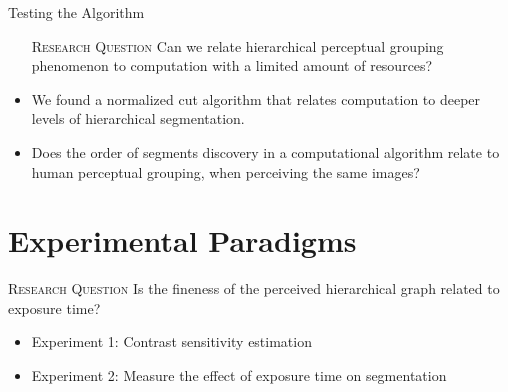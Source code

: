 \documentclass[10pt,xcolor=svgnames]{beamer} %
\begin{document}
\begin{frame}{Testing the Algorithm}
    \begin{itemize}
        \begin{exampleblock}{\textsc{Research Question}}
            Can we relate hierarchical perceptual grouping phenomenon to computation with a limited amount of resources?
        \end{exampleblock}
        \pause
        \item We found a normalized cut algorithm that relates computation to deeper levels of hierarchical segmentation.
        \pause
        \item Does the order of segments discovery in a computational algorithm relate to human perceptual grouping, when perceiving the same images?
    \end{itemize}
\end{frame}



\section{Experimental Paradigms}
\begin{frame}{}
    \begin{exampleblock}{\textsc{Research Question}}
        Is the fineness of the perceived hierarchical graph related to exposure time?
    \end{exampleblock}
    \pause
    \begin{itemize}
        \item Experiment 1: Contrast sensitivity estimation
        \pause
        \item Experiment 2: Measure the effect of exposure time on segmentation
    \end{itemize}
\end{frame}
\end{document}
